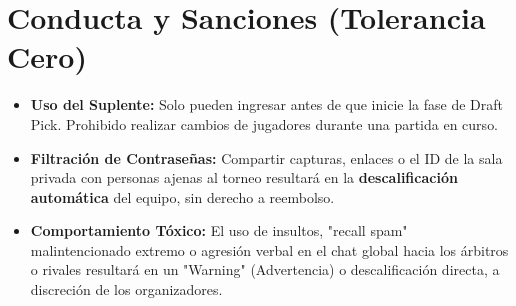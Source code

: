 \documentclass[11pt, a4paper]{article}
\begin{document}
\section{Conducta y Sanciones (Tolerancia Cero)}
\begin{itemize}
    \item \textbf{Uso del Suplente:} Solo pueden ingresar antes de que inicie la fase de Draft Pick. Prohibido realizar cambios de jugadores durante una partida en curso.
    \item \textbf{Filtración de Contraseñas:} Compartir capturas, enlaces o el ID de la sala privada con personas ajenas al torneo resultará en la \textbf{descalificación automática} del equipo, sin derecho a reembolso.
    \item \textbf{Comportamiento Tóxico:} El uso de insultos, "recall spam" malintencionado extremo o agresión verbal en el chat global hacia los árbitros o rivales resultará en un "Warning" (Advertencia) o descalificación directa, a discreción de los organizadores.
\end{itemize}
\end{document}
